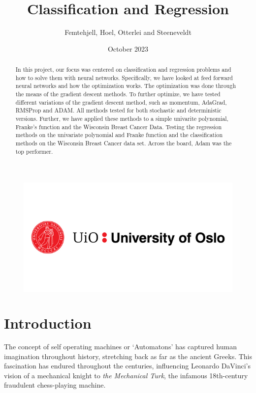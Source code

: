 \documentclass{article}
\title{Classification and Regression}
\author{Femtehjell, Hoel, Otterlei and Steeneveldt}
\date{October 2023}
\theoremstyle{definition}
\begin{document}

\maketitle
\begin{figure}[H]
    \centering
    \includegraphics[scale=0.5]{1797261_uio-logo.png}
\end{figure}
\newpage
\tableofcontents
\listoffigures


\newpage

\begin{abstract}
    In this project, our focus was centered on classification and regression problems and how to solve them with neural networks. Specifically, we have looked at feed forward neural networks and how the optimization works. The optimization was done through the means of the gradient descent methods. To further optimize, we have tested different variations of the gradient descent method, such as momentum, AdaGrad, RMSProp and ADAM. All methods tested for both stochastic and deterministic versions. Further, we have applied these methods to a simple univarite polynomial, Franke's function and the Wisconsin Breast Cancer Data. Testing the regression methods on the univariate polynomial and Franke function and the classification methods on the Wisconsin Breast Cancer data set. Across the board, Adam was the top performer.
\end{abstract}

\section{Introduction}
The concept of self operating machines or `Automatons' has captured human imagination throughout history, stretching back as far as the ancient Greeks. This fascination has endured throughout the centuries, influencing Leonardo DaVinci's vision of a mechanical knight to \textit{the Mechanical Turk}, the infamous 18th-century fraudulent chess-playing machine.
\end{document}
